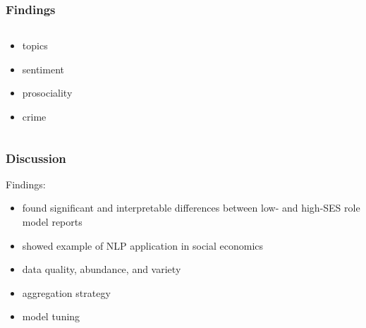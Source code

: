 \begin{frame}
	\frametitle{Findings}
	\begin{columns}[t]
		\begin{column}{0.18\textwidth}
			\begin{itemize}
				\item<1> topics
				\item<2> sentiment
				\item<3> prosociality
				\item<4> crime
			\end{itemize}
		\end{column}
		\begin{column}{0.82\textwidth}
			\only<1>{
				\begin{figure}
					\resizebox{7cm}{!}{}
				\end{figure}
			}
			\only<2>{
				\begin{figure}
					\resizebox{7cm}{!}{}
				\end{figure}
			}
			\only<3>{
				\begin{figure}
					\resizebox{7cm}{!}{}
				\end{figure}
			}
			\only<4>{
				\begin{figure}
					\resizebox{7cm}{!}{}
				\end{figure}
			}
		\end{column}
	\end{columns}
\end{frame}

\begin{frame}
	\frametitle{Discussion}
	Findings:
	\begin{itemize}
		\item<1->[\checkmark] found significant and interpretable differences between low- and high-SES role model reports
		\item<2->[\checkmark] showed example of NLP application in social economics
	\end{itemize}

	\begin{itemize}
		\item<3->[!] data quality, abundance, and variety
		\item<4->[!] aggregation strategy
		\item<5->[!] model tuning
	\end{itemize}

	\begin{center}
	\end{center}
\end{frame}
